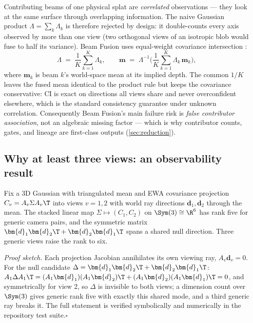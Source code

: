 Contributing beams of one physical splat are \emph{correlated} observations --- they look at
the same surface through overlapping information.  The naive Gaussian product
$\Lambda = \sum_k \Lambda_k$ is therefore rejected by design: it double-counts every axis
observed by more than one view (two orthogonal views of an isotropic blob would fuse to half
its variance).  Beam Fusion uses equal-weight covariance intersection
\citep{julier1997_ci}:
\begin{equation}
  \Lambda \;=\; \frac{1}{K} \sum_{k=1}^{K} \Lambda_k,
  \qquad
  \bm{m} \;=\; \Lambda^{-1} \Big( \frac{1}{K} \sum_{k=1}^{K} \Lambda_k\, \bm{m}_k \Big),
  \label{eq:ci}
\end{equation}
where $\bm{m}_k$ is beam $k$'s world-space mean at its implied depth.  The common $1/K$
leaves the fused mean identical to the product rule but keeps the covariance conservative:
CI is exact on directions all views share and never overconfident elsewhere, which is the
standard consistency guarantee under unknown correlation.  Consequently Beam Fusion's main
failure risk is \emph{false contributor association}, not an algebraic missing factor ---
which is why contributor counts, gates, and lineage are first-class outputs
(\cref{sec:reduction}).

\subsection{Why at least three views: an observability result}
\label{sec:observability}

\begin{proposition}
\label{prop:rank5}
Fix a 3D Gaussian with triangulated mean and EWA covariance projection
$C_v = A_v \Sigma A_v\T$ into views $v = 1, 2$ with world ray directions
$\bm{d}_1, \bm{d}_2$ through the mean.  The stacked linear map
$\Sigma \mapsto (C_1, C_2)$ on $\Sym(3) \cong \R^6$ has rank five for generic camera pairs,
and the symmetric matrix $\bm{d}_1 \bm{d}_2\T + \bm{d}_2 \bm{d}_1\T$ spans a shared null
direction.  Three generic views raise the rank to six.
\end{proposition}

\emph{Proof sketch.}  Each projection Jacobian annihilates its own viewing ray,
$A_v \bm{d}_v = 0$.  For the null candidate $\Delta = \bm{d}_1 \bm{d}_2\T + \bm{d}_2
\bm{d}_1\T$: $A_1 \Delta A_1\T = (A_1\bm{d}_1)(A_1\bm{d}_2)\T + (A_1\bm{d}_2)(A_1\bm{d}_1)\T
= 0$, and symmetrically for view 2, so $\Delta$ is invisible to both views; a dimension count
over $\Sym(3)$ gives generic rank five with exactly this shared mode, and a third generic ray
breaks it.  The full statement is verified symbolically and numerically in the repository
test suite.\hfill$\square$


